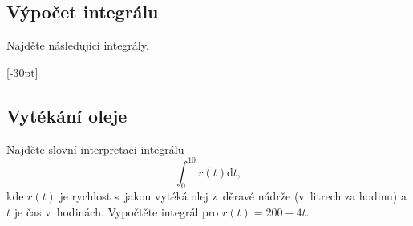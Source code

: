 \def\tg{\mathop{\mathrm{tg}}}
\def\cotg{\mathop{\mathrm{cotg}}}
\def\arctg{\mathop{\mathrm{arctg}}}

\stranka

\subsection{Výpočet integrálu} Najděte následující integrály.




\stranka

[-30pt]

\subsection{Vytékání oleje} Najděte slovní interpretaci integrálu
\begin{equation*}
  \int_0^{10} r(t)\mathrm dt,
\end{equation*}
kde $r(t)$ je rychlost s~jakou vytéká olej z~děravé nádrže (v~litrech
za hodinu) a $t$ je čas v~hodinách. Vypočtěte integrál pro $r(t)=200-4t$.


